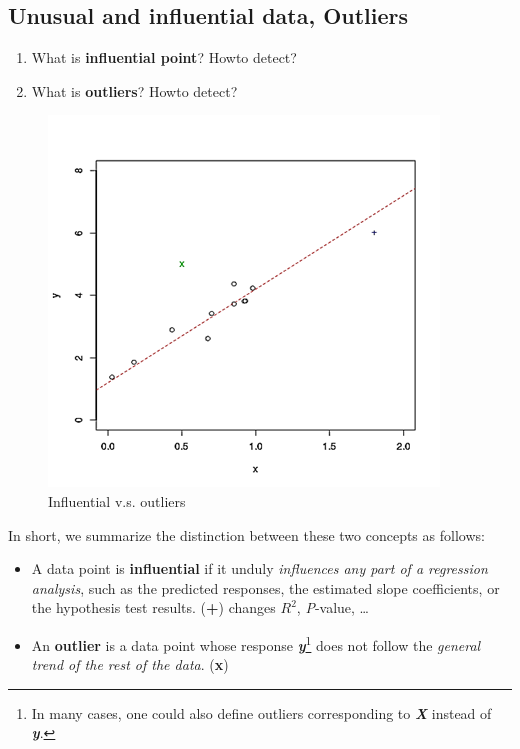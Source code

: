 \subsection{Unusual and influential data,
	Outliers}\label{unusual-and-influential-data-outliers}

\begin{enumerate}
	\def\labelenumi{\alph{enumi}.}
	\item
	What is \textbf{influential point}? Howto detect?
	\item
	What is \textbf{outliers}? Howto detect?
\end{enumerate}

\begin{figure}\centering
	\includegraphics[scale=.6]{./figures/lm_ivo.png}
	\caption{Influential v.s. outliers}
\end{figure}

In short, we summarize the distinction between these two concepts as
follows:

\begin{itemize}
	\item
	A data point is \textbf{influential} if it unduly \emph{influences any
		part of a regression analysis}, such as the predicted responses, the
	estimated slope coefficients, or the hypothesis test results.
	(\textbf{+}) changes \(R^{2}\), \emph{P}-value, \ldots{}
	\item
	An \textbf{outlier} is a data point whose response
	\emph{\textbf{y}}\footnote{In many cases, one could also define
		outliers corresponding to \emph{\textbf{X}} instead of
		\emph{\textbf{y}}.} does not follow the \emph{general trend of the
		rest of the data}. (\textbf{x})
\end{itemize}

